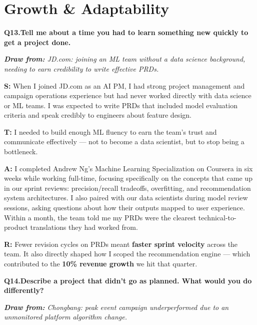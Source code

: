 \documentclass[10pt, letterpaper]{article}
\newcommand{\q}[2]{%
    \smallskip
    \noindent\textbf{\small Q#1.}\quad\textbf{#2}
    \vspace{3pt}
}
\newcommand{\hint}[1]{%
    \begin{notebox}
    \footnotesize\textit{\textbf{Draw from:} #1}
    \end{notebox}
}
\newcommand{\s}[1]{\textbf{\textcolor{starlabel}{S:}} #1}
\newcommand{\ta}[1]{\textbf{\textcolor{starlabel}{T:}} #1}
\newcommand{\ac}[1]{\textbf{\textcolor{starlabel}{A:}} #1}
\newcommand{\res}[1]{\textbf{\textcolor{starlabel}{R:}} #1}
\begin{document}
\section{Growth \& Adaptability}

\q{13}{Tell me about a time you had to learn something new quickly to get a project done.}
\hint{JD.com: joining an ML team without a data science background, needing to earn credibility to write effective PRDs.}

\begin{answerbox}
\footnotesize
\s{When I joined JD.com as an AI PM, I had strong project management and campaign operations experience but had never worked directly with data science or ML teams. I was expected to write PRDs that included model evaluation criteria and speak credibly to engineers about feature design.}

\medskip
\ta{I needed to build enough ML fluency to earn the team's trust and communicate effectively --- not to become a data scientist, but to stop being a bottleneck.}

\medskip
\ac{I completed Andrew Ng's Machine Learning Specialization on Coursera in six weeks while working full-time, focusing specifically on the concepts that came up in our sprint reviews: precision/recall tradeoffs, overfitting, and recommendation system architectures. I also paired with our data scientists during model review sessions, asking questions about how their outputs mapped to user experience. Within a month, the team told me my PRDs were the clearest technical-to-product translations they had worked from.}

\medskip
\res{Fewer revision cycles on PRDs meant \textbf{faster sprint velocity} across the team. It also directly shaped how I scoped the recommendation engine --- which contributed to the \textbf{10\% revenue growth} we hit that quarter.}
\end{answerbox}

\q{14}{Describe a project that didn't go as planned. What would you do differently?}
\hint{Chongbang: peak event campaign underperformed due to an unmonitored platform algorithm change.}
\end{document}
